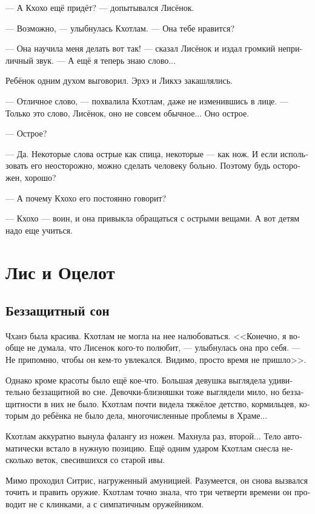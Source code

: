 \documentclass[a4paper,12pt,fleqn]{book}\usepackage{cooltooltips}\usepackage{polyglossia}\setdefaultlanguage{russian}\setotherlanguage{english}\defaultfontfeatures{Ligatures=TeX,Mapping=tex-text} \usepackage{xcolor}\definecolor{lightgray}{HTML}{bbbbbb}\color{lightgray}\newcommand{\ml}[3]{\textenglish{\textcolor{black}{#3}}}
\newcommand{\asterism}{\vspace{1em}{\centering\Large\bfseries$\ast~\ast~\ast$\par}\vspace{1em}}
\begin{document}
--- А Кхохо ещё придёт? --- допытывался Лисёнок.

--- Возможно, --- улыбнулась Кхотлам.
--- Она тебе нравится?

--- Она научила меня делать вот так! --- сказал Лисёнок и издал громкий неприличный звук.
--- А ещё я теперь знаю слово...

Ребёнок одним духом выговорил.
Эрхэ и Ликхэ закашлялись.

--- Отличное слово, --- похвалила Кхотлам, даже не изменившись в лице.
--- Только это слово, Лисёнок, оно не совсем обычное...
Оно острое.

--- Острое?

--- Да.
Некоторые слова острые как спица, некоторые --- как нож.
И если использовать его неосторожно, можно сделать человеку больно.
Поэтому будь осторожен, хорошо?

--- А почему Кхохо его постоянно говорит?

--- Кхохо --- воин, и она привыкла обращаться с острыми вещами.
А вот детям надо еще учиться.

\chapter{Лис и Оцелот}

\section{Беззащитный сон}

Чханэ была красива.
Кхотлам не могла на нее налюбоваться.
<<Конечно, я вообще не думала, что Лисенок кого-то полюбит, --- улыбнулась она про себя.
--- Не припомню, чтобы он кем-то увлекался.
Видимо, просто время не пришло>>.

Однако кроме красоты было ещё кое-что.
Большая девушка выглядела удивительно беззащитной во сне.
Девочки-близняшки тоже выглядели мило, но беззащитности в них не было.
Кхотлам почти видела тяжёлое детство, кормильцев, которым до ребёнка не было дела, многочисленные проблемы в Храме...

\asterism

Кхотлам аккуратно вынула фалангу из ножен.
Махнула раз, второй...
Тело автоматически встало в нужную позицию.
Ещё одним ударом Кхотлам снесла несколько веток, свесившихся со старой ивы.

Мимо проходил Ситрис, нагруженный амуницией.
Разумеется, он снова вызвался точить и править оружие.
Кхотлам точно знала, что три четверти времени он проводит не с клинками, а с симпатичным оружейником.
\end{document}
